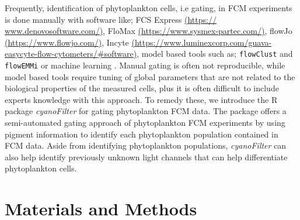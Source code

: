 \documentclass[a4paper,12pt]{extarticle}
\begin{document}
Frequently, identification of phytoplankton cells, i.e gating, in FCM experiments is done manually with software like; FCS Express \href{https://
	www.denovosoftware.com/}{(https://
	www.denovosoftware.com/)}, FloMax \href{https://www.sysmex-partec.com/}{(https://www.sysmex-partec.com/)}, flowJo \href{https://www.flowjo.com/}{(https://www.flowjo.com/)}, Incyte \href{https://www.luminexcorp.com/guava-easycyte-flow-cytometers/\#software}{(https://www.luminexcorp.com/guava-easycyte-flow-cytometers/\#software)}, model based tools such as; \texttt{flowClust} \citep{Lo:2009} and \texttt{flowEMMi} \citep{Ludwig:2019} or machine learning \citep{Fontana:2018}. Manual gating is often not reproducible, while model based tools require tuning of global parameters that are not related to the biological properties of the measured cells, plus it is often difficult to include experts knowledge with this approach\citep{Malek:2015a}. To remedy these, we introduce the R package \emph{cyanoFilter} for gating phytoplankton FCM data. The package offers a semi-automated gating approach of phytoplankton FCM experiments by using pigment information to identify each phytoplankton population contained in FCM data. Aside from identifying phytoplankton populations, \emph{cyanoFilter} can also help identify previously unknown light channels that can help differentiate phytoplankton cells.


\section*{Materials and Methods}
\end{document}
